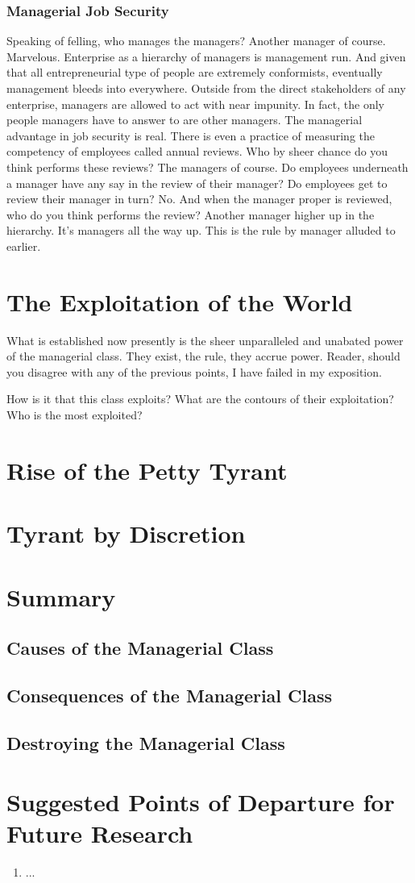 \documentclass[12pt]{article}
\begin{document}
\subsubsection{Managerial Job Security}
Speaking of felling, who manages the managers?
Another manager of course.
Marvelous.
Enterprise as a hierarchy of managers is management run.
And given that all entrepreneurial type of people are extremely conformists, eventually management bleeds into everywhere.
Outside from the direct stakeholders of any enterprise, managers are allowed to act with near impunity.
In fact, the only people managers have to answer to are other managers.
The managerial advantage in job security is real.
There is even a practice of measuring the competency of employees called annual reviews.
Who by sheer chance do you think performs these reviews?
The managers of course.
Do employees underneath a manager have any say in the review of their manager?
Do employees get to review their manager in turn?
No.
And when the manager proper is reviewed, who do you think performs the review?
Another manager higher up in the hierarchy.
It's managers all the way up.
This is the rule by manager alluded to earlier.

\section{The Exploitation of the World}
What is established now presently is the sheer unparalleled and unabated power of the managerial class.
They exist, the rule, they accrue power.
Reader, should you disagree with any of the previous points, I have failed in my exposition.

How is it that this class exploits?
What are the contours of their exploitation?
Who is the most exploited?

\section{Rise of the Petty Tyrant}
\section{Tyrant by Discretion}

\section{Summary}
\subsection{Causes of the Managerial Class}
\subsection{Consequences of the Managerial Class}
\subsection{Destroying the Managerial Class}

\section{Suggested Points of Departure for Future Research}


\begin{enumerate}
    \item ...
\end{enumerate}
\end{document}
